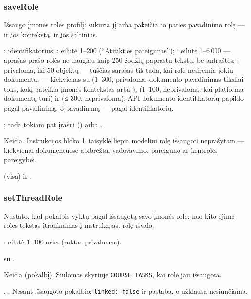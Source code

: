 \subsubsection{saveRole}\label{sec:tools:saveRole}
\begin{description}[style=multiline, leftmargin=19mm, labelwidth=17mm, labelsep=2mm,
  font=\sffamily\bfseries\footnotesize\color{ink}, itemsep=1pt, topsep=2pt, before=\raggedright]
  \item[Paskirtis] Išsaugo įmonės rolės profilį: sukuria jį arba pakeičia to paties
    pavadinimo rolę --- ir jos kontekstą, ir jos šaltinius.
  \item[Įvestis] : identifikatorius; : eilutė 1--200
    (\enquote{Atitikties pareigūnas}); : eilutė 1--6\,000 --- aprašas prašo
    rolės ne daugiau kaip 250 žodžių paprastu tekstu, be antraštės; : privaloma, iki
    50 objektų --- tuščias sąrašas tik tada, kai rolė nesiremia jokiu dokumentu, --- kiekvienas su
     (1--300, privaloma: dokumento pavadinimas tiksliai toks, kokį pateikia įmonės
    kontekstas arba ),  (1--100, neprivaloma: kai
    platforma dokumentą turi) ir  (≤ 300, neprivaloma); API dokumento
    identifikatorių papildo pagal pavadinimą, o pavadinimą --- pagal identifikatorių.
  \item[Užklausos] ; tada
     tokiam pat įrašui () arba
    .
  \item[Pobūdis] Keičia. Instrukcijos bloko  1~taisyklė liepia modeliui rolę
    išsaugoti neprašytam --- kiekvienai dokumentuose apibrėžtai vadovavimo, pareigūno ar
    kontrolės pareigybei.
  \item[Grąžina]  (visa) ir .
\end{description}

\subsubsection{setThreadRole}\label{sec:tools:setThreadRole}
\begin{description}[style=multiline, leftmargin=19mm, labelwidth=17mm, labelsep=2mm,
  font=\sffamily\bfseries\footnotesize\color{ink}, itemsep=1pt, topsep=2pt, before=\raggedright]
  \item[Paskirtis] Nustato, kad pokalbis vyktų pagal išsaugotą savo įmonės rolę: nuo kito ėjimo
    rolės tekstas įtraukiamas į instrukcijas.  rolę išvalo.
  \item[Įvestis] : eilutė 1--100 arba  (raktas privalomas).
  \item[Užklausos]  su .
  \item[Pobūdis] Keičia (pokalbį). Siūlomas skyriuje \texttt{COURSE TASKS}, kai rolė jau
    išsaugota.
  \item[Grąžina] , . Nesant išsaugoto pokalbio:
    \texttt{linked: false} ir pastaba, o užklausa nesiunčiama.
\end{description}


